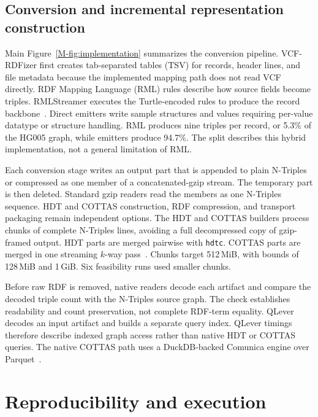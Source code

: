 \documentclass[11pt]{article}
\begin{document}
\subsection{Conversion and incremental representation construction}\label{subsec:model-construction}
Main Figure~\ref{M-fig:implementation} summarizes the conversion pipeline.
VCF-RDFizer first creates tab-separated tables (TSV) for records, header lines, and file metadata because the implemented mapping path does not read VCF directly.
RDF Mapping Language (RML) rules describe how source fields become triples.
RMLStreamer executes the Turtle-encoded rules to produce the record backbone~\cite{rml_2024,rmlstreamer_2022}.
Direct emitters write sample structures and values requiring per-value datatype or structure handling.
RML produces nine triples per record, or 5.3\% of the HG005 graph, while emitters produce 94.7\%.
The split describes this hybrid implementation, not a general limitation of RML.

Each conversion stage writes an output part that is appended to plain N-Triples or compressed as one member of a concatenated-gzip stream.
The temporary part is then deleted.
Standard gzip readers read the members as one N-Triples sequence.
HDT and COTTAS construction, RDF compression, and transport packaging remain independent options.
The HDT and COTTAS builders process chunks of complete N-Triples lines, avoiding a full decompressed copy of gzip-framed output.
HDT parts are merged pairwise with \texttt{hdtc}.
COTTAS parts are merged in one streaming $k$-way pass~\cite{hdtcpp,hdt_2013,hdtc_2026,Diefenbach2020HDTCat,pycottas_2026}.
Chunks target 512\,MiB, with bounds of 128\,MiB and 1\,GiB.
Six feasibility runs used smaller chunks.

Before raw RDF is removed, native readers decode each artifact and compare the decoded triple count with the N-Triples source graph.
The check establishes readability and count preservation, not complete RDF-term equality.
QLever decodes an input artifact and builds a separate query index.
QLever timings therefore describe indexed graph access rather than native HDT or COTTAS queries.
The native COTTAS path uses a DuckDB-backed Comunica engine over Parquet~\cite{comunica_cottas_2026}.

\section{Reproducibility and execution}\label{sec:repro}
\end{document}
